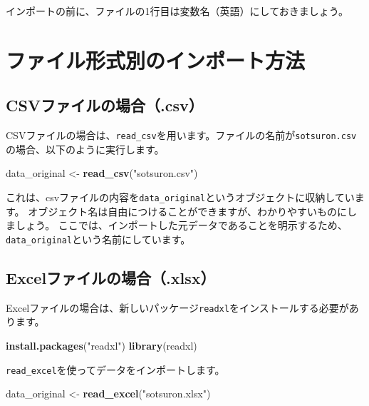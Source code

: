\documentclass[]{book}
\newenvironment{Shaded}{\begin{snugshade}}{\end{snugshade}}
\newcommand{\KeywordTok}[1]{\textcolor[rgb]{0.13,0.29,0.53}{\textbf{#1}}}
\newcommand{\StringTok}[1]{\textcolor[rgb]{0.31,0.60,0.02}{#1}}
\newcommand{\NormalTok}[1]{#1}
\begin{document}
インポートの前に、ファイルの1行目は変数名（英語）にしておきましょう。

\section{ファイル形式別のインポート方法}\label{ux30d5ux30a1ux30a4ux30ebux5f62ux5f0fux5225ux306eux30a4ux30f3ux30ddux30fcux30c8ux65b9ux6cd5}

\subsection{CSVファイルの場合（.csv）}\label{csvux30d5ux30a1ux30a4ux30ebux306eux5834ux5408.csv}

CSVファイルの場合は、\texttt{read\_csv}を用います。ファイルの名前が\texttt{sotsuron.csv}の場合、以下のように実行します。

\begin{Shaded}
\begin{Highlighting}[]
\NormalTok{data_original <-}\StringTok{ }\KeywordTok{read_csv}\NormalTok{(}\StringTok{"sotsuron.csv"}\NormalTok{)}
\end{Highlighting}
\end{Shaded}

これは、csvファイルの内容を\texttt{data\_original}というオブジェクトに収納しています。
オブジェクト名は自由につけることができますが、わかりやすいものにしましょう。
ここでは、インポートした元データであることを明示するため、\texttt{data\_original}という名前にしています。

\subsection{Excelファイルの場合（.xlsx）}\label{excelux30d5ux30a1ux30a4ux30ebux306eux5834ux5408.xlsx}

Excelファイルの場合は、新しいパッケージ\texttt{readxl}をインストールする必要があります。

\begin{Shaded}
\begin{Highlighting}[]
\KeywordTok{install.packages}\NormalTok{(}\StringTok{"readxl"}\NormalTok{)}
\KeywordTok{library}\NormalTok{(readxl)}
\end{Highlighting}
\end{Shaded}

\texttt{read\_excel}を使ってデータをインポートします。

\begin{Shaded}
\begin{Highlighting}[]
\NormalTok{data_original <-}\StringTok{ }\KeywordTok{read_excel}\NormalTok{(}\StringTok{"sotsuron.xlsx"}\NormalTok{)}
\end{Highlighting}
\end{Shaded}
\end{document}
